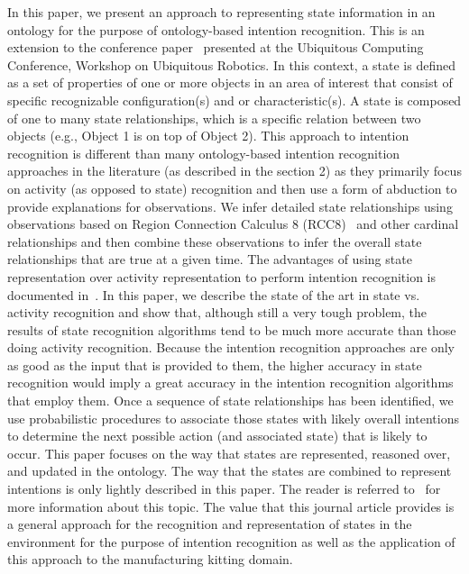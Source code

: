 \documentclass[preprint,12pt]{elsarticle}
\begin{document}
In this paper, we present an approach to representing state information in an ontology for the purpose of ontology-based intention recognition. This is an extension to the conference paper~\cite{SCHLENOFF.UBICOMP.2012} presented at the Ubiquitous Computing Conference, Workshop on Ubiquitous Robotics. In this context, a state is defined as a set of properties of one or more objects in an area of interest that consist of specific recognizable configuration(s) and or characteristic(s). A state is composed of one to many state relationships, which is a specific relation between two objects (e.g., Object 1 is on top of Object 2). This approach to intention recognition is different than many ontology-based intention recognition approaches in the literature (as described in the section 2) as they primarily focus on activity (as opposed to state) recognition and then use a form of abduction to provide explanations for observations. We infer detailed state relationships using observations based on Region Connection Calculus 8 (RCC8)~\cite{RANDELL.ICKRR.1992} and other cardinal relationships and then combine these observations to infer the overall state relationships that are true at a given time. The advantages of using state representation over activity representation to perform intention recognition is documented in~\cite{SCHLENOFF.ECDRM.2012}. In this paper, we describe the state of the art in state vs. activity recognition and show that, although still a very tough problem, the results of state recognition algorithms tend to be much more accurate than those doing activity recognition. Because the intention recognition approaches are only as good as the input that is provided to them, the higher accuracy in state recognition would imply a great accuracy in the intention recognition algorithms that employ them. Once a sequence of state relationships has been identified, we use probabilistic procedures to associate those states with likely overall intentions to determine the next possible action (and associated state) that is likely to occur. This paper focuses on the way that states are represented, reasoned over, and updated in the ontology. The way that the states are combined to represent intentions is only lightly described in this paper. The reader is referred to~\cite{SCHLENOFF.ECDRM.2012} for more information about this topic. The value that this journal article provides is a general approach for the recognition and representation of states in the environment for the purpose of intention recognition as well as the application of this approach to the manufacturing kitting domain.
\end{document}
